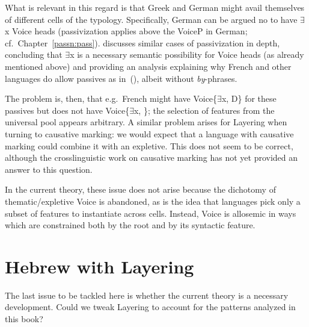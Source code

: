 What is relevant in this regard is that Greek and German might avail themselves of different cells of the typology. Specifically, German can be argued no to have $\exists$x Voice heads (passivization applies above the VoiceP in German; cf.~Chapter~\ref{passn:pass}). \cite{schaefer17oup} discusses similar cases of passivization in depth, concluding that $\exists$x is a necessary semantic possibility for Voice heads (as already mentioned above) and providing an analysis explaining why French and other languages do allow passives as in~(\lastx), albeit without \emph{by}-phrases.

The problem is, then, that e.g.~French might have Voice\{$\exists$x, D\} for these passives but does not have Voice\{$\exists$x, \zero\}; the selection of features from the universal pool appears arbitrary. A similar problem arises for Layering when turning to causative marking: we would expect that a language with causative marking could combine it with an expletive. This does not seem to be correct, although the crosslinguistic work on causative marking has not yet provided an answer to this question.

In the current theory, these issue does not arise because the dichotomy of thematic/expletive Voice is abandoned, as is the idea that languages pick only a subset of features to instantiate across cells. Instead, Voice is allosemic in ways which are constrained both by the root and by its syntactic feature.




\section{Hebrew with Layering} \label{aas:hebrew}
The last issue to be tackled here is whether the current theory is a necessary development. Could we tweak Layering to account for the patterns analyzed in this book?

